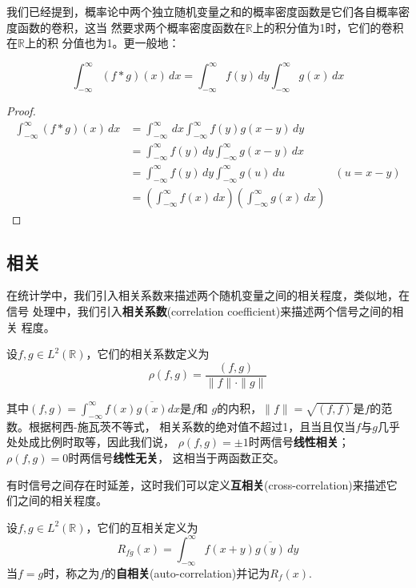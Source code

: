 我们已经提到，概率论中两个独立随机变量之和的概率密度函数是它们各自概率密度函数的卷积，这当
然要求两个概率密度函数在$\mathbb{R}$上的积分值为1时，它们的卷积在$\mathbb{R}$上的积
分值也为1。更一般地：
\begin{proposition}[卷积的“面积”关系]
    \[\int_{-\infty}^{\infty}(f*g)(x)\,dx=\int_{-\infty}^{\infty}f(y)\,dy\int_{-\infty}^{\infty}g(x)\,dx\]
\end{proposition}
\begin{proof}
    \begin{align*}
        \int_{-\infty}^{\infty}(f*g)(x)\,dx & =\int_{-\infty}^{\infty}\,dx\int_{-\infty}^{\infty}f(y)g(x-y)\,dy                                   \\
                                            & =\int_{-\infty}^{\infty}f(y)\,dy\int_{-\infty}^{\infty}g(x-y)\,dx                                   \\
                                            & =\int_{-\infty}^{\infty}f(y)\,dy\int_{-\infty}^{\infty}g(u)\,du                           & (u=x-y) \\
                                            & =\left(\int_{-\infty}^{\infty}f(x)\,dx\right)\left(\int_{-\infty}^{\infty}g(x)\,dx\right)
    \end{align*}
\end{proof}

\subsection{相关}\label{sub:correlation}
在统计学中，我们引入相关系数来描述两个随机变量之间的相关程度，类似地，在信号
处理中，我们引入\textbf{相关系数}(correlation coefficient)来描述两个信号之间的相关
程度。
\begin{definition}[相关系数]
    设$f,g\in L^2(\mathbb{R})$，它们的相关系数定义为
    \begin{equation*}
        \rho(f,g)=\frac{(f,g)}{\|f\|\cdot\|g\|}
    \end{equation*}
\end{definition}
其中$(f,g)=\int_{-\infty}^{\infty}f(x)\overline{g(x)}dx$是$f$和
$g$的内积，$\|f\|=\sqrt{(f,f)}$是$f$的范数。根据柯西-施瓦茨不等式，
相关系数的绝对值不超过1，且当且仅当$f$与$g$几乎处处成比例时取等，因此我们说，
$\rho(f,g)=\pm 1$时两信号\textbf{线性相关}；$\rho(f,g)=0$时两信号\textbf{线性无关}，
这相当于两函数正交。

有时信号之间存在时延差，这时我们可以定义\textbf{互相关}(cross-correlation)来描述它
们之间的相关程度。
\begin{definition}[互相关]
    设$f,g\in L^2(\mathbb{R})$，它们的互相关定义为
    \begin{equation*}
        R_{fg}(x)=\int_{-\infty}^{\infty}f(x+y)\overline{g(y)}\,dy
    \end{equation*}
    当$f=g$时，称之为$f$的\textbf{自相关}(auto-correlation)并记为$R_f(x)$.
\end{definition}

